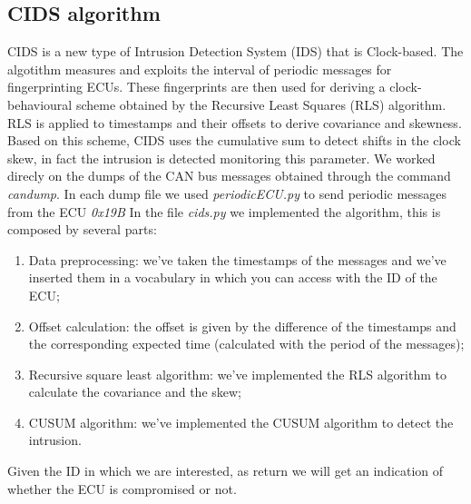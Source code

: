 \documentclass[12pt]{article}
\begin{document}
\subsection{CIDS algorithm}
CIDS is a new type of Intrusion Detection System (IDS) that is Clock-based. The algotithm measures and 
exploits the interval of periodic messages for fingerprinting ECUs. These fingerprints are then used for 
deriving a clock-behavioural scheme obtained by the Recursive Least Squares (RLS) algorithm. RLS is 
applied to timestamps and their offsets to derive covariance and skewness. Based on this scheme, 
CIDS uses the cumulative sum to detect shifts in the clock skew, in fact the intrusion is detected 
monitoring this parameter. We worked direcly on the dumps of the CAN bus messages obtained through 
the command \textit{candump}. In each dump file we used \textit{periodicECU.py} to send periodic 
messages from the ECU \textit{0x19B}
In the file \textit{cids.py} we implemented the algorithm, this is composed by several 
parts:
\begin{enumerate}
    \item Data preprocessing: we've taken the timestamps of the messages and we've inserted them 
    in a vocabulary in which you can access with the ID of the ECU;
    \item Offset calculation: the offset is given by the difference of the timestamps and the corresponding
    expected time (calculated with the period of the messages);
    \item Recursive square least algorithm: we've implemented the RLS algorithm to calculate the covariance 
    and the skew;
    \item CUSUM algorithm: we've implemented the CUSUM algorithm to detect the intrusion. 
\end{enumerate}
Given the ID in which we are interested, as return we will get an indication of whether the ECU is
compromised or not.
\end{document}
